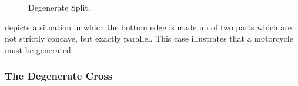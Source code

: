 \documentclass[12pt,a4paper,oneside,openany]{article}
\begin{document}
\begin{figure}[htpb]
\begin{center}
\caption{Degenerate Split.}
\label{fig:parallelnonsplit}
\end{center}
\end{figure}


 depicts a situation in which the bottom edge is made up of two parts which are not strictly concave, but exactly parallel. This case illustrates that a motorcycle must be generated 

\subsubsection{The Degenerate Cross}
\end{document}

